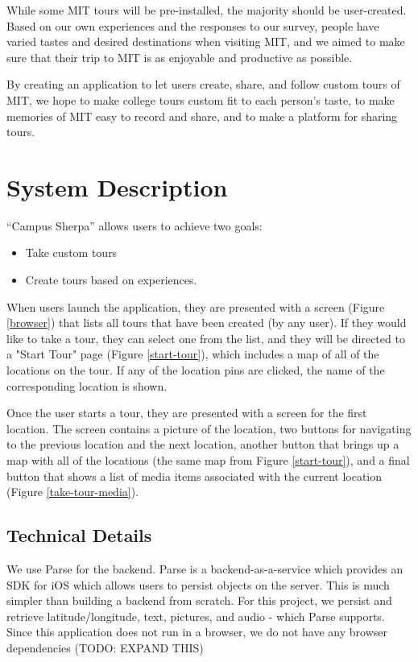\documentclass{sigchi}
\begin{document}
While some MIT tours will be pre-installed, the majority should be user-created.
Based on our own experiences and the responses to our survey, people have varied tastes and desired destinations when visiting MIT, and we aimed to make sure that their trip to MIT is as enjoyable and productive as possible.

By creating an application to let users create, share, and follow custom tours of MIT, we hope to make college tours custom fit to each person’s taste, to make memories of MIT easy to record and share, and to make a platform for sharing tours.

\section{System Description}

``Campus Sherpa'' allows users to achieve two goals: 

\begin{itemize}
	\item Take custom tours
	\item Create tours based on experiences.
\end{itemize}

When users launch the application, they are presented with a screen (Figure \ref{browser}) that lists all tours that have been created (by any user). If they would like to take a tour, they can select one from the list, and they will be directed to a "Start Tour" page (Figure \ref{start-tour}), which includes a map of all of the locations on the tour. If any of the location pins are clicked, the name of the corresponding location is shown.

Once the user starts a tour, they are presented with a screen for the first location. The screen contains a picture of the location, two buttons for navigating to the previous location and the next location, another button that brings up a map with all of the locations (the same map from Figure \ref{start-tour}), and a final button that shows a list of media items associated with the current location (Figure \ref{take-tour-media}).

\subsection{Technical Details}
We use Parse for the backend. Parse is a backend-as-a-service which provides an SDK for iOS which allows users to persist objects on the server. This is much simpler than building a backend from scratch. For this project, we persist and retrieve latitude/longitude, text, pictures, and audio - which Parse supports. Since this application does not run in a browser, we do not have any browser dependencies (TODO: EXPAND THIS)
    
\end{document}
